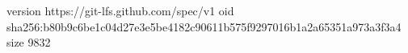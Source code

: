 version https://git-lfs.github.com/spec/v1
oid sha256:b80b9c6be1c04d27e3e5be4182c90611b575f9297016b1a2a65351a973a3f3a4
size 9832
